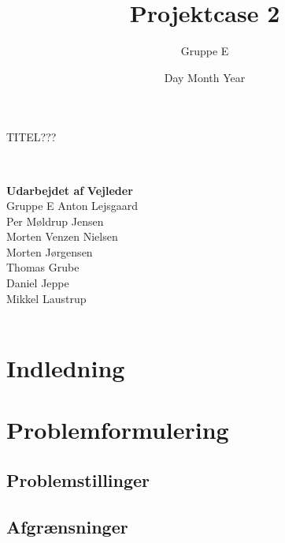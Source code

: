 \documentclass[12pt,a4paper]{report}
\title{Projektcase 2}
\author{Gruppe E}
\date{Day Month Year} %
\begin{document}
\pagestyle{empty}
\maketitle
\centering
\begin{huge}
TITEL???
\end{huge}\\
\raggedright {\textbf{Udarbejdet af}} \hfill {\textbf{Vejleder}\\
Gruppe E \hfill Anton Lejsgaard\\
Per Møldrup Jensen\\
Morten Venzen Nielsen\\
Morten Jørgensen\\
Thomas Grube\\
Daniel Jeppe\\
Mikkel Laustrup}\\
\\
\raggedright %
\newpage
\pagestyle{fancy}
\setcounter{secnumdepth}{0} %
\section{Indledning}
\newpage
\tableofcontents
\newpage
\section{Problemformulering}
\subsection{Problemstillinger}
\subsection{Afgrænsninger}
\end{document}
